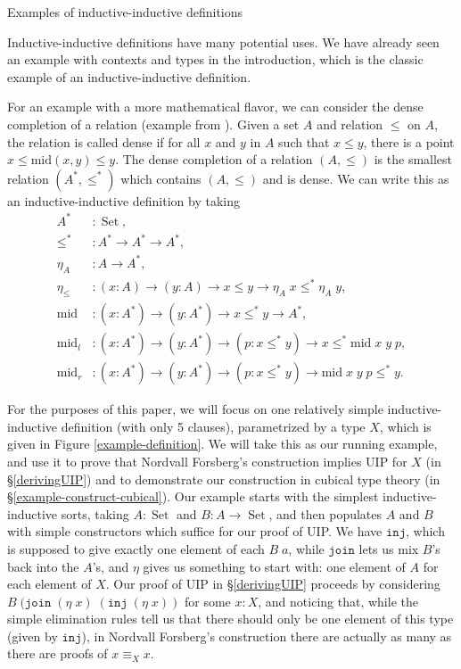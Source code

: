 \documentclass[acmsmall,review]{acmart}\settopmatter{printfolios=true,printccs=false,printacmref=false}
\DeclareMathOperator{\USet}{Set}
\newcommand{\IdA}[3]{{#1}\equiv_{#3}{#2}}
\newcommand{\join}{\texttt{join}}
\newcommand{\inj}{\texttt{inj}}
\def\Forsberg/{Nordvall Forsberg}
\begin{document}
\begin{section}{\label{II-examples}Examples of inductive-inductive definitions}

Inductive-inductive definitions have many potential uses.
We have already seen an example with contexts and types in the introduction, which is the classic example of an inductive-inductive definition.

For an example with a more mathematical flavor, we can consider the dense completion of a relation (example from \citet{nordvallforsberg2013thesis}). Given a set $A$ and relation $\leq$ on $A$, the relation is called dense if for all $x$ and $y$ in $A$ such that $x \leq y$, there is a point $x \leq \text{mid}(x,y) \leq y$. The dense completion of a relation $(A,\leq)$ is the smallest relation $(A^*,\leq^*)$ which contains $(A,\leq)$ and is dense. We can write this as an inductive-inductive definition by taking
\begin{align*}
A^* &: \USet,\\
\leq^* &: A^* \to A^* \to A^*,\\
\eta_A &: A \to A^*,\\
\eta_\leq &: (x : A) \to (y : A) \to x \leq y \to \eta_A\;x \leq^* \eta_A\;y,\\
\text{mid} &: (x : A^*) \to (y : A^*) \to x \leq^* y \to A^*,\\
\text{mid}_l &: (x : A^*) \to (y : A^*) \to (p : x \leq^* y) \to x \leq^* \text{mid}\;x\;y\;p,\\
\text{mid}_r &: (x : A^*) \to (y : A^*) \to (p : x \leq^* y) \to \text{mid}\;x\;y\;p \leq^* y.
\end{align*}

For the purposes of this paper, we will focus on one relatively simple inductive-inductive definition (with only 5 clauses), parametrized by a type $X$, which is given in Figure \ref{example-definition}.
We will take this as our running example, and use it to prove that \Forsberg/'s construction implies UIP for $X$ (in \S\ref{derivingUIP}) and to demonstrate our construction in cubical type theory (in \S\ref{example-construct-cubical}).
Our example starts with the simplest inductive-inductive sorts, taking $A : \USet$ and $B : A \to \USet$, and then populates $A$ and $B$ with simple constructors which suffice for our proof of UIP. We have $\inj$, which is supposed to give exactly one element of each $B\;a$, while $\join$ lets us mix $B$'s back into the $A$'s, and $\eta$ gives us something to start with: one element of $A$ for each element of $X$.
Our proof of UIP in \S\ref{derivingUIP} proceeds by considering $B\;(\join\;(\eta\;x)\;(\inj\;(\eta\;x))$ for some $x : X$, and noticing that, while the simple elimination rules tell us that there should only be one element of this type (given by $\inj$), in \Forsberg/'s construction there are actually as many as there are proofs of $\IdA{x}{x}{X}$.


\end{section}
\end{document}
